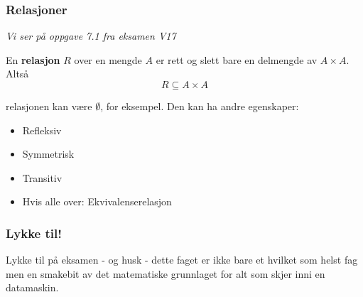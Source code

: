 \documentclass{beamer}
\begin{document}
\begin{frame}
	\frametitle{Relasjoner}
	\textit{Vi ser på oppgave 7.1 fra eksamen V17}
	
	En \textbf{relasjon} $R$ over en mengde $A$ er rett og slett bare en delmengde av $A \times A$. Altså \[R \subseteq A \times A\]
	
	relasjonen kan være $\emptyset$, for eksempel. Den kan ha andre egenskaper:
	
	\begin{itemize}
		\item Refleksiv
		\item Symmetrisk
		\item Transitiv
		\item Hvis alle over: Ekvivalenserelasjon
	\end{itemize}
\end{frame}

\begin{frame}
	\frametitle{Lykke til!}
	
	Lykke til på eksamen - og husk - dette faget er ikke bare et hvilket som helst fag men en smakebit av det matematiske grunnlaget for alt som skjer inni en datamaskin.
\end{frame}
\end{document}
